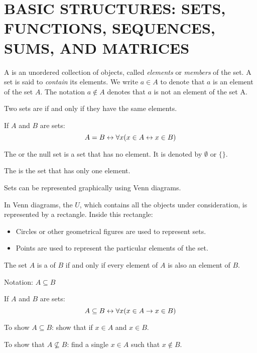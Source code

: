 \chapter{BASIC STRUCTURES: SETS, FUNCTIONS, SEQUENCES, SUMS, AND MATRICES}



            \par A  is an unordered collection of objects, called \textit{elements} or
            \textit{members} of the set. A set is said to \textit{contain} its elements. We write
            $a \in A$ to denote that $a$ is an element of the set $A$. The notation $a \not \in A$
            denotes that $a$ is not an element of the set A.

            \par Two sets are  if and only if they have the same elements.
            \par If $A$ and $B$ are sets:
            \begin{equation}
                A = B \leftrightarrow \forall x (x \in A \leftrightarrow x \in B)
            \end{equation}

            \par The  or the null set is a set that has no element. It is denoted
            by $\emptyset$ or $\{\}$.
            \par The  is the set that has only one element.

            \par Sets can be represented graphically using Venn diagrams.
            \par In Venn diagrams, the  $U$, which contains all the objects under
            consideration, is represented by a rectangle. Inside this rectangle:
            \begin{itemize}
                \item Circles or other geometrical figures are used to represent sets. 
                \item Points are used to represent the particular elements of the set.
            \end{itemize}
            
            \par The set $A$ is a  of $B$ if and only if every element of $A$ is also
            an element of $B$.
            \par Notation: $A \subseteq B$
            \par If $A$ and $B$ are sets:
            \begin{equation}
                A \subseteq B \leftrightarrow \forall x (x \in A \rightarrow x \in B)
            \end{equation}
            \par To show $A \subseteq B$: show that if $x \in A$ and $x \in B$.
            \par To show that $A \not \subseteq B$: find a single $x \in A$ such that $x \not \in B$.

